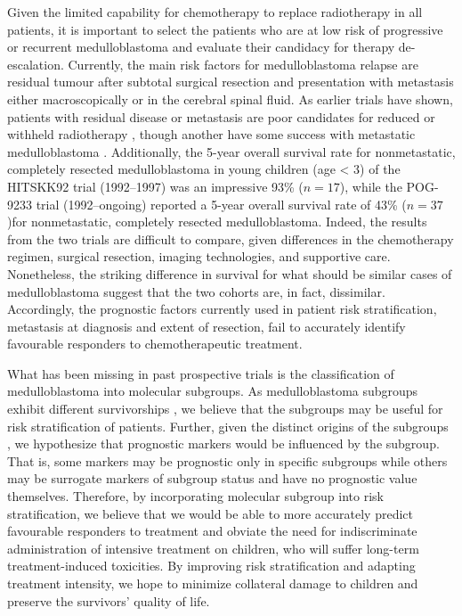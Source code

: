 Given the limited capability for chemotherapy to replace radiotherapy in all patients, it is important to select the patients who are at low risk of progressive or recurrent medulloblastoma and evaluate their candidacy for therapy de-escalation. Currently, the main risk factors for medulloblastoma relapse are residual tumour after subtotal surgical resection and presentation with metastasis either macroscopically or in the cerebral spinal fluid. As earlier trials have shown, patients with residual disease or metastasis are poor candidates for reduced or withheld radiotherapy , though another have some success with metastatic medulloblastoma . Additionally, the 5-year overall survival rate for nonmetastatic, completely resected medulloblastoma in young children (age < 3) of the HITSKK92 trial (1992--1997) was an impressive 93\% ($n = 17$), while the POG-9233 trial (1992--ongoing) reported a 5-year overall survival rate of 43\% ($n = 37$)for nonmetastatic, completely resected medulloblastoma. Indeed, the results from the two trials are difficult to compare, given differences in the chemotherapy regimen, surgical resection, imaging technologies, and supportive care. Nonetheless, the striking difference in survival for what should be similar cases of medulloblastoma suggest that the two cohorts are, in fact, dissimilar. Accordingly, the prognostic factors currently used in patient risk stratification, metastasis at diagnosis and extent of resection, fail to accurately identify favourable responders to chemotherapeutic treatment.

What has been missing in past prospective trials is the classification of medulloblastoma into molecular subgroups. As medulloblastoma subgroups exhibit different survivorships , we believe that the subgroups may be useful for risk stratification of patients. Further, given the distinct origins of the subgroups , we hypothesize that prognostic markers would be influenced by the subgroup. That is, some markers may be prognostic only in specific subgroups while others may be surrogate markers of subgroup status and have no prognostic value themselves. Therefore, by incorporating molecular subgroup into risk stratification, we believe that we would be able to more accurately predict favourable responders to treatment and obviate the need for indiscriminate administration of intensive treatment on children, who will suffer long-term treatment-induced toxicities. By improving risk stratification and adapting treatment intensity, we hope to minimize collateral damage to children and preserve the survivors' quality of life.

